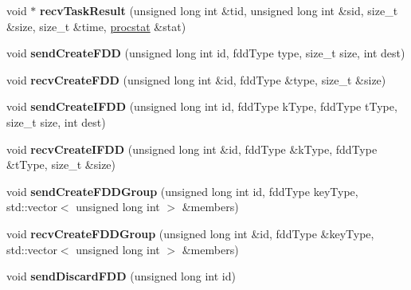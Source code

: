 \begin{DoxyCompactItemize}
\item 
\hypertarget{classfaster_1_1fastComm_a3aa757618c68f0f22ced5f0276bf525e}{}void $\ast$ {\bfseries recv\+Task\+Result} (unsigned long int \&tid, unsigned long int \&sid, size\+\_\+t \&size, size\+\_\+t \&time, \hyperlink{classfaster_1_1procstat}{procstat} \&stat)\label{classfaster_1_1fastComm_a3aa757618c68f0f22ced5f0276bf525e}

\item 
\hypertarget{classfaster_1_1fastComm_aedf068e090c89b62cf23bb060ed98bd8}{}void {\bfseries send\+Create\+F\+D\+D} (unsigned long int id, fdd\+Type type, size\+\_\+t size, int dest)\label{classfaster_1_1fastComm_aedf068e090c89b62cf23bb060ed98bd8}

\item 
\hypertarget{classfaster_1_1fastComm_a6335e73103253b835208bbb3b15a318a}{}void {\bfseries recv\+Create\+F\+D\+D} (unsigned long int \&id, fdd\+Type \&type, size\+\_\+t \&size)\label{classfaster_1_1fastComm_a6335e73103253b835208bbb3b15a318a}

\item 
\hypertarget{classfaster_1_1fastComm_a1b714530bd2e7c2e0c6a65480bdf5dcf}{}void {\bfseries send\+Create\+I\+F\+D\+D} (unsigned long int id, fdd\+Type k\+Type, fdd\+Type t\+Type, size\+\_\+t size, int dest)\label{classfaster_1_1fastComm_a1b714530bd2e7c2e0c6a65480bdf5dcf}

\item 
\hypertarget{classfaster_1_1fastComm_a81974b476357e1d465268d58b14de068}{}void {\bfseries recv\+Create\+I\+F\+D\+D} (unsigned long int \&id, fdd\+Type \&k\+Type, fdd\+Type \&t\+Type, size\+\_\+t \&size)\label{classfaster_1_1fastComm_a81974b476357e1d465268d58b14de068}

\item 
\hypertarget{classfaster_1_1fastComm_a66d4d60b7222f81167428594a26d1138}{}void {\bfseries send\+Create\+F\+D\+D\+Group} (unsigned long int id, fdd\+Type key\+Type, std\+::vector$<$ unsigned long int $>$ \&members)\label{classfaster_1_1fastComm_a66d4d60b7222f81167428594a26d1138}

\item 
\hypertarget{classfaster_1_1fastComm_a7c04292c7b224a00fbe414e6d22d4bf4}{}void {\bfseries recv\+Create\+F\+D\+D\+Group} (unsigned long int \&id, fdd\+Type \&key\+Type, std\+::vector$<$ unsigned long int $>$ \&members)\label{classfaster_1_1fastComm_a7c04292c7b224a00fbe414e6d22d4bf4}

\item 
\hypertarget{classfaster_1_1fastComm_a7e1ca7788c4310cb84640812fa50a012}{}void {\bfseries send\+Discard\+F\+D\+D} (unsigned long int id)\label{classfaster_1_1fastComm_a7e1ca7788c4310cb84640812fa50a012}


\end{DoxyCompactItemize}
